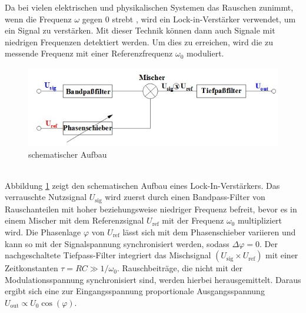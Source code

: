 Da bei vielen elektrischen und physikalischen Systemen das Rauschen zunimmt, wenn
die Frequenz $\omega$ gegen 0 strebt \cite{enet}, wird ein Lock-in-Verstärker
verwendet, um ein Signal zu verstärken. Mit dieser Technik können dann auch
Signale mit niedrigen Frequenzen detektiert werden. Um dies zu erreichen, wird die
zu messende Frequenz mit einer Referenzfrequenz $\omega_0$ moduliert. \\
\begin{figure}[h]
  \includegraphics{Bilder/Schema.jpg}
  \caption{schematischer Aufbau}
  \label{fig:schema}
\end{figure} \\
Abbildung \ref{fig:schema} zeigt den schematischen Aufbau eines Lock-In-Verstärkers.
Das verrauschte Nutzsignal $U_\text{sig}$ wird zuerst durch einen Bandpass-Filter
von Rauschanteilen mit hoher beziehungsweise niedriger Frequenz befreit, bevor
es in einem Mischer mit dem Referenzsignal $U_\text{ref}$ mit der Frequenz $\omega_0$
multipliziert wird. Die Phasenlage $\varphi$ von $U_\text{ref}$ lässt sich mit dem
Phasenschieber variieren und kann so mit der Signalspannung synchronisiert werden,
sodass $\Delta\varphi =0$.
Der nachgeschaltete Tiefpass-Filter integriert das Mischsignal $(U_\text{sig}\times U_\text{ref})$
mit einer Zeitkonstanten $\tau = RC \gg 1/\omega_0$.
Rauschbeiträge, die nicht mit der Modulationsspannung synchronisiert sind, werden
hierbei herausgemittelt. Daraus ergibt sich eine zur Eingangsspannung proportionale
Ausgangsspannung $U_\text{out} \propto U_0 \cos(\varphi)$.

